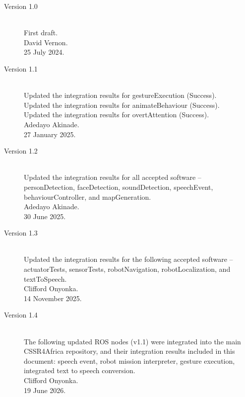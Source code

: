 \documentclass{CSSRforAfrica}
\begin{document}
\begin{description}

\item [Version 1.0]~\\
First draft. \\
David Vernon. \\                               
25 July 2024.      

\item [Version 1.1]~\\
Updated the integration results for gestureExecution (Success). \\
Updated the integration results for animateBehaviour (Success). \\
Updated the integration results for overtAttention (Success). \\
Adedayo Akinade. \\                               
27 January 2025.   

\item [Version 1.2]~\\
Updated the integration results for all accepted software -- personDetection, faceDetection, soundDetection, speechEvent, behaviourController, and mapGeneration. \\
Adedayo Akinade. \\                               
30 June 2025.   

\item [Version 1.3]~\\
Updated the integration results for the following accepted software -- actuatorTests, sensorTests, robotNavigation, robotLocalization, and textToSpeech. \\
Clifford Onyonka. \\
14 November 2025.

\item [Version 1.4]~\\
The following updated ROS nodes (v1.1) were integrated into the main CSSR4Africa repository, and their integration results included in this document: speech event, robot mission interpreter, gesture execution, integrated text to speech conversion. \\
Clifford Onyonka. \\
19 June 2026.

\end{description}
\end{document}
